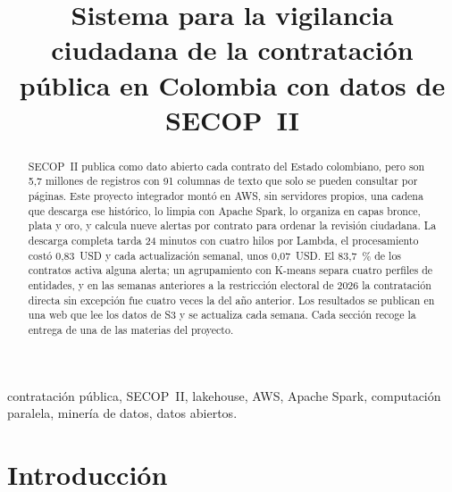 \documentclass[conference,letterpaper]{IEEEtran}
\begin{document}
\title{Sistema para la vigilancia ciudadana de la contratación pública en Colombia con datos de SECOP~II}

\author{%
}

\maketitle
\pagestyle{informe}
\thispagestyle{informe}

\begin{abstract}
SECOP~II publica como dato abierto cada contrato del Estado colombiano, pero son 5,7 millones de registros con
91 columnas de texto que solo se pueden consultar por páginas. Este proyecto integrador montó en AWS, sin
servidores propios, una cadena que descarga ese histórico, lo limpia con Apache Spark, lo organiza en capas
bronce, plata y oro, y calcula nueve alertas por contrato para ordenar la revisión ciudadana. La descarga
completa tarda 24 minutos con cuatro hilos por Lambda, el procesamiento costó 0,83~USD y cada actualización
semanal, unos 0,07~USD. El 83,7~\% de los contratos activa alguna alerta; un agrupamiento con K-means separa cuatro
perfiles de entidades, y en las semanas anteriores a la restricción electoral de 2026 la contratación directa sin excepción
fue cuatro veces la del año anterior. Los resultados se publican en una web que lee los datos de S3 y se actualiza cada semana. Cada sección recoge la entrega de una de las materias del proyecto.
\end{abstract}

\begin{IEEEkeywords}
contratación pública, SECOP~II, lakehouse, AWS, Apache Spark, computación paralela, minería de datos, datos abiertos.
\end{IEEEkeywords}

\section{Introducción}\label{sec:intro}
\end{document}
